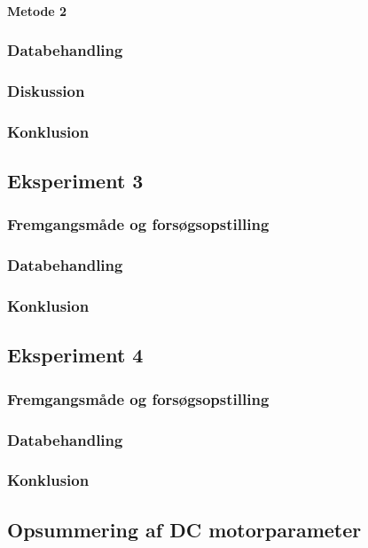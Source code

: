 \paragraph{Metode 2}
\subsubsection{Databehandling}
\subsubsection{Diskussion}
\subsubsection{Konklusion}


\subsection{Eksperiment 3}
\subsubsection{Fremgangsmåde og forsøgsopstilling}
\subsubsection{Databehandling}
\subsubsection{Konklusion}


\subsection{Eksperiment 4}
\subsubsection{Fremgangsmåde og forsøgsopstilling}
\subsubsection{Databehandling}

\subsubsection{Konklusion}

\subsection{Opsummering af DC motorparameter}